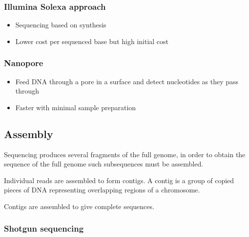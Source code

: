 \documentclass[a4paper]{article}
\begin{document}
\subsubsection{Illumina Solexa approach}

\begin{itemize}
  \item Sequencing based on synthesis
  \item Lower cost per sequenced base but high initial cost
\end{itemize}

\subsubsection{Nanopore}

\begin{itemize}
  \item
    Feed DNA through a pore in a surface and detect nucleotides as they pass
    through

  \item
    Faster with minimal sample preparation

\end{itemize}

\subsection{Assembly}

Sequencing produces several fragments of the full genome, in order to obtain the
sequence of the full genome such subsequences must be assembled.

Individual reads are assembled to form contigs. A contig is a group of copied
pieces of DNA representing overlapping regions of a chromosome.

Contigs are assembled to give complete sequences.

\subsubsection{Shotgun sequencing}
\end{document}
